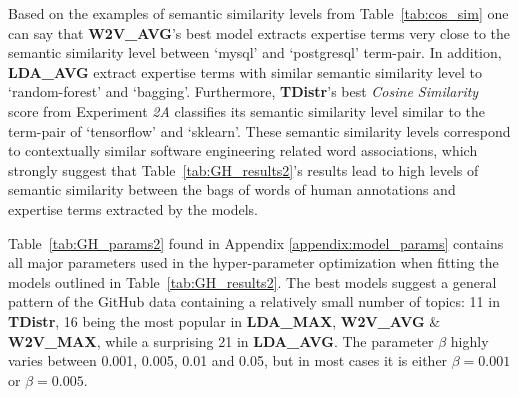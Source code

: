             Based on the examples of semantic similarity levels from Table~\ref{tab:cos_sim} one can say that \textbf{W2V\_AVG}'s best model extracts expertise terms very close to the semantic similarity level between `mysql' and `postgresql' term-pair. In addition, \textbf{LDA\_AVG} extract expertise terms with similar semantic similarity level to `random-forest' and `bagging'. Furthermore, \textbf{TDistr}'s best \emph{Cosine Similarity} score from Experiment \emph{2A} classifies its semantic similarity level similar to the term-pair of `tensorflow' and `sklearn'. These semantic similarity levels correspond to contextually similar software engineering related word associations, which strongly suggest that Table~\ref{tab:GH_results2}'s results lead to high levels of semantic similarity between the bags of words of human annotations and expertise terms extracted by the models.
             
            Table~\ref{tab:GH_params2} found in Appendix \ref{appendix:model_params} contains all major parameters used in the hyper-parameter optimization when fitting the models outlined in Table~\ref{tab:GH_results2}. The best models suggest a general pattern of the GitHub data containing a relatively small number of topics: 11 in \textbf{TDistr}, 16 being the most popular in \textbf{LDA\_MAX}, \textbf{W2V\_AVG} \& \textbf{W2V\_MAX}, while a surprising 21 in \textbf{LDA\_AVG}. The parameter $\beta$ highly varies between 0.001, 0.005, 0.01 and 0.05, but in most cases it is either $\beta=0.001$ or $\beta=0.005$.
            
